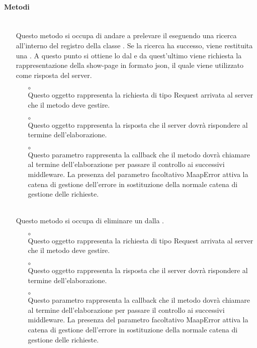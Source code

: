 \paragraph*{Metodi}
\begin{itemize}
\item[]  \\ Questo metodo si occupa di andare a prelevare il  eseguendo una ricerca all'interno del registro della classe . Se la ricerca ha successo, viene restituita una . A questo punto si ottiene lo  dal  e da quest'ultimo viene richiesta la rappresentazione della show-page in formato json, il quale viene utilizzato come risposta del server.
\begin{itemize}\addtolength{\itemsep}{-0.5\baselineskip}
\item[$\circ$]  \\ Questo oggetto rappresenta la richiesta di tipo Request arrivata al server che il metodo deve gestire.
\item[$\circ$]  \\ Questo oggetto rappresenta la risposta che il server dovrà rispondere al termine dell'elaborazione.
\item[$\circ$]  \\ Questo parametro rappresenta la callback che il metodo dovrà chiamare al termine dell'elaborazione per passare il controllo ai successivi middleware. La presenza del parametro facoltativo MaapError attiva la catena di gestione dell'errore in sostituzione della normale catena di gestione delle richieste.
\end{itemize}
\item[]  \\ Questo metodo si occupa di eliminare un  dalla .
\begin{itemize}\addtolength{\itemsep}{-0.5\baselineskip}
\item[$\circ$]  \\ Questo oggetto rappresenta la richiesta di tipo Request arrivata al server che il metodo deve gestire.
\item[$\circ$]  \\ Questo oggetto rappresenta la risposta che il server dovrà rispondere al termine dell'elaborazione.
\item[$\circ$]  \\ Questo parametro rappresenta la callback che il metodo dovrà chiamare al termine dell'elaborazione per passare il controllo ai successivi middleware. La presenza del parametro facoltativo MaapError attiva la catena di gestione dell'errore in sostituzione della normale catena di gestione delle richieste.
\end{itemize}
\end{itemize}


